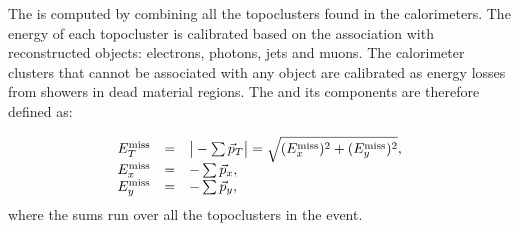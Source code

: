 The \met{} is computed by combining all the topoclusters found in the
calorimeters. The energy of each topocluster is calibrated based on
the association with reconstructed objects: electrons, photons, jets
and muons. The calorimeter clusters that cannot be associated with any
object are calibrated as energy losses from showers in dead material
regions. The \met{} and its components are therefore defined as:

\begin{equation}\label{eq:met}
\begin{array}{lcl}
E^{\rm miss}_{T} & = & \big|-\sum\vec{p}_T \big| = \sqrt{(E^{\rm miss}_{x})^2 + (E^{\rm miss}_{y})^2} ,\\
E^{\rm miss}_{x} & = & -\sum\vec{p}_x ,\\
E^{\rm miss}_{y} & = & -\sum\vec{p}_y ,\\
\end{array}	\end{equation}
where the sums run over all the topoclusters in the event.
